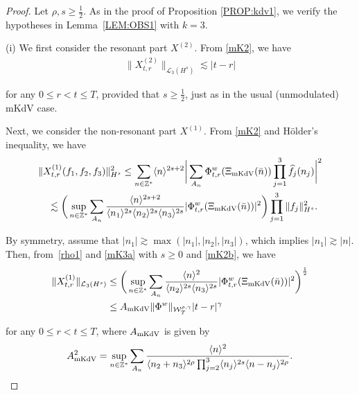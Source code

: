 \documentclass[letterpaper, 11pt,  reqno]{amsart}
\newcommand{\1}{\hspace{0.5mm}\text{I}\hspace{0.5mm}}
\newcommand{\noi}{\noindent}
\newcommand{\Z}{\mathbb{Z}}
\newcommand{\g}{\gamma}
\newcommand{\ft}{\widehat}
\newcommand{\les}{\lesssim}
\newcommand{\ges}{\gtrsim}
\newcommand{\jb}[1]
{\langle #1 \rangle}
\newcommand{\cL}{\mathcal{L}}
\newcommand{\W}{\mathcal{W}}
\newcommand{\MKDV}{\text{\rm mKdV} }
\numberwithin{equation}{section}
\numberwithin{theorem}{section}
\begin{document}
\begin{proof}
Let $\rho, s \ge \frac 12$.
As in the proof of Proposition \ref{PROP:kdv1}, 
we verify  the hypotheses
in Lemma~\ref{LEM:OBS1} 
with $k = 3$.


\medskip

\noi
(i) 
We first consider  the resonant part $X^{(2)}$.
From \eqref{mK2}, 
we have
\begin{align*}
\|X_{t,r}^{(2)} \|_{\cL_3 (H^s)}
\les 
  |t-r| 
\end{align*}

\noi
for any $0 \le r < t \le T$, 
provided that 
 $s \ge \frac 12$, just as in the usual (unmodulated) mKdV case.


Next, we consider the non-resonant part  $X^{(1)}$.
From \eqref{mK2} and H\"older's inequality, we have 
\begin{equation}
\begin{split}
& \|X_{t,r}^{(1)}(f_1, f_2, f_3)\|^2_{H^{s} }
\le\sum_{n\in \Z^*} \jb{n}^{2s+2}
\bigg| \sum_{A_n} 
\Phi^{w}_{t,r} (\Xi_\MKDV(\bar n ))
\prod_{j = 1}^3 \ft f_j(n_j)
 \bigg|^2\\
&\quad \les \bigg(
\sup_{n\in \Z^*} 
\sum_{A_n} 
\frac{\jb{n}^{2s+2} }{\jb{n_1}^{2s} \jb{n_2}^{2s}\jb{n_3}^{2s}}
|\Phi^{w}_{t,r}(\Xi_\MKDV(\bar n))|^2  \bigg) 
\prod_{j=1}^3  \| f_j\|^2_{H^{s}  }   .
\end{split}
\label{mK4x}
\end{equation}


\noi
By symmetry, 
assume that $|n_1| \ges \max (|n_1|, |n_2|,  |n_3|)$, 
which implies $|n_1|\ges |n|$.
Then, from~\eqref{rho1}
and   \eqref{mK3a} with $s \ge 0$ and \eqref{mK2b}, we have 
\begin{align}
\begin{aligned}
\|X_{t,r}^{(1)}\|_{\cL_3 (H^{s})} 
&\leq \bigg( \sup_{n\in \Z^*} 
\sum_{A_n}
\frac{\jb{n}^{2} }{ \jb{n_2}^{2s}\jb{n_3}^{2s}}
|\Phi^{w}_{t,r}( \Xi_\MKDV (\bar n)) |^2\bigg)^\frac 12\\
&\leq A_\MKDV \| \Phi^w \|_{\W_T^{\rho,\g}}|t-r|^{\g}
\end{aligned}
\label{mK4a}
\end{align}



\noi
for any $0 \le r <  t \le T$, 
where $A_\MKDV$ is given by 
\begin{align*}
A_\MKDV^2 =  \sup_{n\in \Z^*} 
\sum_{A_n}
\frac{\jb{n}^{2} }{\jb{n_2 + n_3}^{2\rho}\prod_{j = 2}^3\jb{n_j}^{2s} \jb{n - n_j}^{2\rho}}.
\end{align*}



\end{proof}
\end{document}
